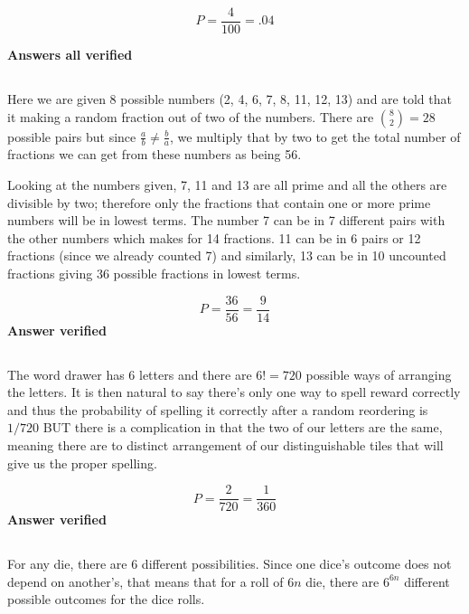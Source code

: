 \begin{equation}
	P=\frac{4}{100}=.04
\label{answer1.10b}
\end{equation}

\textbf{Answers all verified}

\subsection{}
Here we are given 8 possible numbers (2, 4, 6, 7, 8, 11, 12, 13) and are told that it making a random fraction out of two of the numbers.  There are $\binom{8}{2}=28$ possible pairs but since $\frac{a}{b} \neq \frac{b}{a}$, we multiply that by two to get the total number of fractions we can get from these numbers as being 56.  

Looking at the numbers given, 7, 11 and 13 are all prime and all the others are divisible by two; therefore only the fractions that contain one or more prime numbers will be in lowest terms.  The number 7 can be in 7 different pairs with the other numbers which makes for 14 fractions.  11 can be in 6 pairs or 12 fractions (since we already counted 7) and similarly, 13 can be in 10 uncounted fractions giving 36 possible fractions in lowest terms.

\begin{equation}
	P=\frac{36}{56}=\frac{9}{14}
\label{answer1.11}
\end{equation}
\textbf{Answer verified}

\subsection{}
The word drawer has 6 letters and there are $6!=720$ possible ways of arranging the letters.  It is then natural to say there's only one way to spell reward correctly and thus the probability of spelling it correctly after a random reordering is $1/720$ BUT there is a complication in that the two of our letters are the same, meaning there are to distinct arrangement of our distinguishable tiles that will give us the proper spelling.

\begin{equation}
	P=\frac{2}{720} = \frac{1}{360}
\label{answer1.12}
\end{equation}
\textbf{Answer verified}

\subsection{}
For any die, there are 6 different possibilities.  Since one dice's outcome does not depend on another's, that means that for a roll of $6n$ die, there are $6^{6n}$ different possible outcomes for the dice rolls.  

